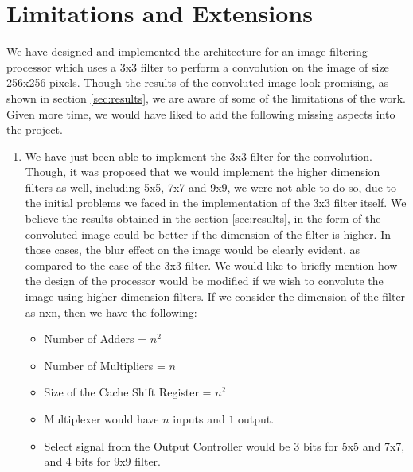\documentclass[11pt,a4paper]{article}
\begin{document}
\FloatBarrier

\section{Limitations and Extensions}
\label{sec:limitations}

We have designed and implemented the architecture for an image filtering processor which uses a 3x3 filter to perform a convolution on the image of size 256x256 pixels. Though the results of the convoluted image look promising, as shown in section \ref{sec:results}, we are aware of some of the limitations of the work. Given more time, we would have liked to add the following missing aspects into the project.

\begin{enumerate}
\item We have just been able to implement the 3x3 filter for the convolution. Though, it was proposed that we would implement the higher dimension filters as well, including 5x5, 7x7 and 9x9, we were not able to do so, due to the initial problems we faced in the implementation of the 3x3 filter itself. We believe the results obtained in the section \ref{sec:results}, in the form of the convoluted image could be better if the dimension of the filter is higher. In those cases, the blur effect on the image would be clearly evident, as compared to the case of the 3x3 filter. We would like to briefly mention how the design of the processor would be modified if we wish to convolute the image using higher dimension filters. If we consider the dimension of the filter as nxn, then we have the following:
	\begin{itemize}
		\item Number of Adders = $n^2$
		\item Number of Multipliers = $n$
		\item Size of the Cache Shift Register = $n^2$
		\item Multiplexer would have $n$ inputs and $1$ output.
		\item Select signal from the Output Controller would be 3 bits for 5x5 and 7x7, and 4 bits for 9x9 filter.
	\end{itemize}	
	

\end{enumerate}
\end{document}
